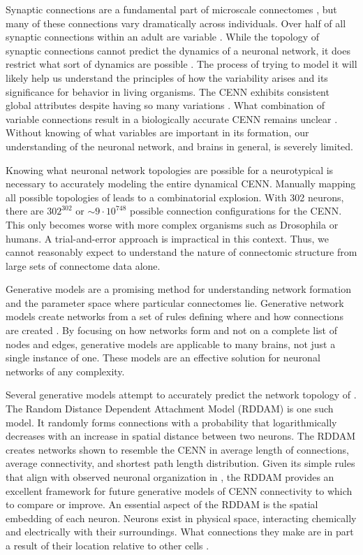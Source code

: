 Synaptic connections are a fundamental part of microscale connectomes \citep{Sporns}, but many of these connections vary dramatically across individuals. 
Over half of all synaptic connections within an adult \ce are variable \citep{Witvliet}. 
While the topology of synaptic connections cannot predict the dynamics of a neuronal network, it does restrict what sort of dynamics are possible \citep{Prinz}. 
The process of trying to model it will likely help us understand the principles of how the variability arises and its significance for behavior in living organisms.
The CENN exhibits consistent global attributes despite having so many variations \citep{PerezEscudero}. 
What combination of variable connections result in a biologically accurate CENN remains unclear \citep{Witvliet}. 
Without knowing of what variables are important in its formation, our understanding of the \ce neuronal network, and brains in general, is severely limited.

Knowing what neuronal network topologies are possible for a neurotypical \ce is necessary to accurately modeling the entire dynamical CENN. 
Manually mapping all possible topologies of \ce leads to a combinatorial explosion. 
With 302 neurons, there are $302^{302}$ or $\sim 9 \cdot 10^{748}$ possible connection configurations for the CENN. 
This only becomes worse with more complex organisms such as Drosophila or humans. 
A trial-and-error approach is impractical in this context.
Thus, we cannot reasonably expect to understand the nature of \ce connectomic structure from large sets of connectome data alone.

Generative models are a promising method for understanding network formation and the parameter space where particular connectomes lie.
Generative network models create networks from a set of rules defining where and how connections are created \citep{Betzel}. 
By focusing on how networks form and not on a complete list of nodes and edges, generative models are applicable to many brains, not just a single instance of one. 
These models are an effective solution for neuronal networks of any complexity. 

Several generative models attempt to accurately predict the network topology of \ce \citep{Costa,Itzhack,Khajezade,Nicosia}. 
The Random Distance Dependent Attachment Model (RDDAM) is one such model\citep{Itzhack}. 
It randomly forms connections with a probability that logarithmically decreases with an increase in spatial distance between two neurons. 
The RDDAM creates networks shown to resemble the CENN in average length of connections, average connectivity, and shortest path length distribution. 
Given its simple rules that align with observed neuronal organization in \ce \citep{PerezEscudero}, the RDDAM provides an excellent framework for future generative models of CENN connectivity to which to compare or improve. 
An essential aspect of the RDDAM is the spatial embedding of each neuron. 
Neurons exist in physical space, interacting chemically and electrically with their surroundings. 
What connections they make are in part a result of their location relative to other cells  \citep{Hentschel,Kaiser,PerezEscudero}. 

